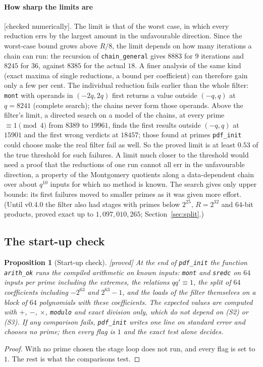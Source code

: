 \documentclass[10pt,a4paper]{article}
\newcommand{\code}[1]{\texttt{#1}}
\newcommand{\stproved}{\textsf{\small[proved]}\xspace}
\newcommand{\stnum}{\textsf{\small[checked numerically]}\xspace}
\theoremstyle{plain}
\newtheorem{proposition}{Proposition}
\theoremstyle{definition}
\begin{document}
\paragraph{How sharp the limits are} \stnum.  The limit is that of the worst case, in which every reduction errs by the largest amount in the unfavourable
direction.  Since the worst-case bound grows above $R/8$, the limit depends on how many iterations a chain can run: the recursion of \code{chain\_general} gives
$8883$ for $9$ iterations and $8245$ for $36$, against $8385$ for the actual $18$.  A finer analysis of the same kind (exact maxima of single reductions, a bound
per coefficient) can therefore gain only a few per cent.  The individual reduction fails earlier than the whole filter: \code{mont} with operands in $(-2q,2q)$
first returns a value outside $(-q,q)$ at $q=8241$ (complete search); the chains never form those operands.  Above the filter's limit, a directed search on a model
of the chains, at every prime $\equiv1\pmod4$ from $8389$ to $19961$, finds the first results outside $(-q,q)$ at $15901$ and the first wrong verdicts at
$18457$; those found at primes \code{pdf\_init} could choose make the real filter fail as well.  So the proved limit is at least $0.53$ of the true threshold for
such failures.  A limit much closer to the threshold would need a proof that the reductions of one run cannot all err in the unfavourable direction, a property of
the Montgomery quotients along a data-dependent chain over about $q^{10}$ inputs for which no method is known.  The search gives only upper bounds: its first
failures moved to smaller primes as it was given more effort.  (Until v0.4.0 the filter also had stages with primes below $2^{25}$, $R=2^{32}$ and $64$-bit
products, proved exact up to $1{,}097{,}010{,}265$; Section~\ref{sec:split}.)

\subsection{The start-up check}

\begin{proposition}[Start-up check]\label{prop:kat}\stproved
At the end of \code{pdf\_init} the function \code{arith\_ok} runs the compiled arithmetic on known inputs: \code{mont} and \code{sredc} on $64$ inputs per prime
including the extremes, the relations $qq'\equiv1$, the split of $64$ coefficients including $-2^{63}$ and $2^{63}-1$, and the loads of the filter themselves on a block of
$64$ polynomials with these coefficients.  The expected values are computed with $+$, $-$, $\times$, \code{modulo} and exact division only, which do not depend on (S2)
or (S3).  If any comparison fails, \code{pdf\_init} writes one line on standard error and chooses no prime; then every flag is $1$ and the exact test alone decides.
\end{proposition}
\begin{proof}
With no prime chosen the stage loop does not run, and every flag is set to $1$.  The rest is what the comparisons test.
\end{proof}
\end{document}
